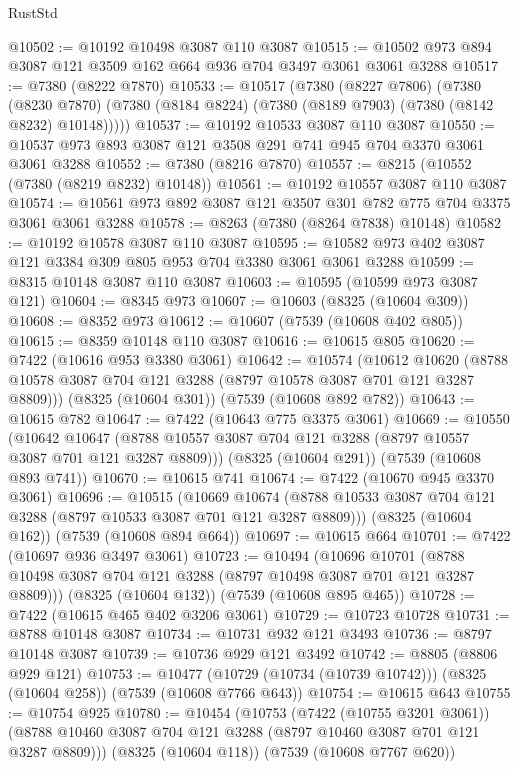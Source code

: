 \begin{lexlean}{RustStd}
\begin{coremodule}
@10502 := @10192 @10498 @3087 @110 @3087
@10515 := @10502 @973 @894 @3087 @121 @3509 @162 @664 @936 @704 @3497 @3061 @3061 @3288
@10517 := @7380 (@8222 @7870)
@10533 := @10517
    (@7380
      (@8227 @7806)
      (@7380
        (@8230 @7870)
        (@7380 (@8184 @8224) (@7380 (@8189 @7903) (@7380 (@8142 @8232) @10148)))))
@10537 := @10192 @10533 @3087 @110 @3087
@10550 := @10537 @973 @893 @3087 @121 @3508 @291 @741 @945 @704 @3370 @3061 @3061 @3288
@10552 := @7380 (@8216 @7870)
@10557 := @8215 (@10552 (@7380 (@8219 @8232) @10148))
@10561 := @10192 @10557 @3087 @110 @3087
@10574 := @10561 @973 @892 @3087 @121 @3507 @301 @782 @775 @704 @3375 @3061 @3061 @3288
@10578 := @8263 (@7380 (@8264 @7838) @10148)
@10582 := @10192 @10578 @3087 @110 @3087
@10595 := @10582 @973 @402 @3087 @121 @3384 @309 @805 @953 @704 @3380 @3061 @3061 @3288
@10599 := @8315 @10148 @3087 @110 @3087
@10603 := @10595 (@10599 @973 @3087 @121)
@10604 := @8345 @973
@10607 := @10603 (@8325 (@10604 @309))
@10608 := @8352 @973
@10612 := @10607 (@7539 (@10608 @402 @805))
@10615 := @8359 @10148 @110 @3087
@10616 := @10615 @805
@10620 := @7422 (@10616 @953 @3380 @3061)
@10642 := @10574
    (@10612 @10620 (@8788 @10578 @3087 @704 @121 @3288 (@8797 @10578 @3087 @701 @121 @3287 @8809)))
    (@8325 (@10604 @301))
    (@7539 (@10608 @892 @782))
@10643 := @10615 @782
@10647 := @7422 (@10643 @775 @3375 @3061)
@10669 := @10550
    (@10642 @10647 (@8788 @10557 @3087 @704 @121 @3288 (@8797 @10557 @3087 @701 @121 @3287 @8809)))
    (@8325 (@10604 @291))
    (@7539 (@10608 @893 @741))
@10670 := @10615 @741
@10674 := @7422 (@10670 @945 @3370 @3061)
@10696 := @10515
    (@10669 @10674 (@8788 @10533 @3087 @704 @121 @3288 (@8797 @10533 @3087 @701 @121 @3287 @8809)))
    (@8325 (@10604 @162))
    (@7539 (@10608 @894 @664))
@10697 := @10615 @664
@10701 := @7422 (@10697 @936 @3497 @3061)
@10723 := @10494
    (@10696 @10701 (@8788 @10498 @3087 @704 @121 @3288 (@8797 @10498 @3087 @701 @121 @3287 @8809)))
    (@8325 (@10604 @132))
    (@7539 (@10608 @895 @465))
@10728 := @7422 (@10615 @465 @402 @3206 @3061)
@10729 := @10723 @10728
@10731 := @8788 @10148 @3087
@10734 := @10731 @932 @121 @3493
@10736 := @8797 @10148 @3087
@10739 := @10736 @929 @121 @3492
@10742 := @8805 (@8806 @929 @121)
@10753 := @10477 (@10729 (@10734 (@10739 @10742))) (@8325 (@10604 @258)) (@7539 (@10608 @7766 @643))
@10754 := @10615 @643
@10755 := @10754 @925
@10780 := @10454
    (@10753
      (@7422 (@10755 @3201 @3061))
      (@8788 @10460 @3087 @704 @121 @3288 (@8797 @10460 @3087 @701 @121 @3287 @8809)))
    (@8325 (@10604 @118))
    (@7539 (@10608 @7767 @620))

\end{coremodule}
\end{lexlean}

